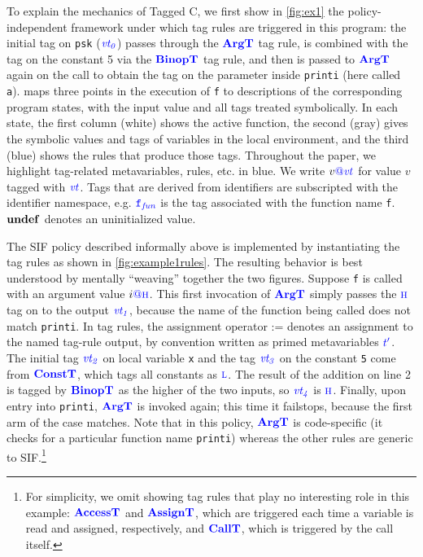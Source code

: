 \documentclass{llncs}
\begin{document}
To explain the mechanics of Tagged C, we first show in \cref{fig:ex1} the policy-independent
framework under which tag rules are triggered in this program: the initial tag on {\tt psk} (\(\vt[_0]\))
passes through the \(\argtname\) tag rule, is combined with the tag on the constant 5 via
the \(\binoptname\) tag rule, and then is passed to \(\argtname\) again on the call
to obtain the tag on the parameter inside {\tt printi} (here called {\tt a}).
 maps three points in the execution of {\tt f} to descriptions of the
corresponding program states, with the input value and all tags treated symbolically.
In each state, the first column (white) shows the active function, the second (gray) gives
the symbolic values and tags of variables in the local environment, and the third (blue)
shows the rules that produce those tags.
Throughout the paper, we highlight tag-related metavariables, rules, etc. in {\color{blue}blue}.
We write \(v\tagat \vt\) for value \(v\) tagged with \(\vt\).
Tags that are derived from identifiers are subscripted with the identifier namespace, e.g.
\(\FN[f]\) is the tag associated with the function name {\tt f}.  
\(\vundef\) denotes an uninitialized value.

The SIF policy described informally above is implemented by instantiating the
tag rules as shown in \cref{fig:example1rules}.  The resulting behavior is best understood
by mentally ``weaving'' together the two figures.
Suppose {\tt f} is called with an argument value \(i \tagat \high\).
This first invocation of \(\argtname\) simply passes the \(\high\) tag on to the output \(\vt[_1]\),
because the name of the function being called does not match {\tt printi}. 
In tag rules, the assignment operator := denotes an assignment to the named tag-rule output, by convention
written as primed metavariables \(\gentag[']\).
The initial tag \(\vt[_2]\) on local variable {\tt x} and the tag \(\vt[_3]\) on the constant {\tt 5}
come from \(\consttname\), which tags all constants as \(\low\).
The result of the addition on line 2 is tagged by \(\binoptname\) as the
higher of the two inputs, so \(\vt[_4]\) is \(\high\). Finally, upon entry into {\tt printi}, \(\argtname\)
is invoked again; this time it failstops, because the first arm of the case matches.
Note that in this policy, \(\argtname\) is code-specific (it checks for a particular function name {\tt printi})
whereas the other rules are generic to SIF.\footnote{
For simplicity, we omit showing tag rules that play no interesting role in this example: 
\(\accesstname\) and \(\assigntname\), 
which are triggered each time a variable is read and assigned, respectively,
and \(\calltname\), which is triggered by the call itself.}
\end{document}
